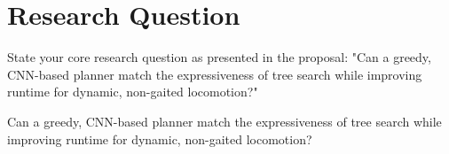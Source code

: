 \section{Research Question}

\begin{outline}
  State your core research question as presented in the proposal: "Can a greedy, CNN-based planner match the expressiveness of tree search while improving runtime for dynamic, non-gaited locomotion?"
\end{outline}

\begin{emphasis}
  Can a greedy, CNN-based planner match the expressiveness of tree search while improving runtime for dynamic, non-gaited locomotion?
\end{emphasis}
